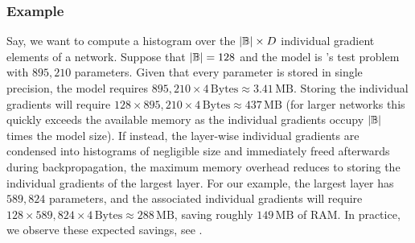 \subsubsection{Example}

Say, we want to compute a histogram over the $|{\mathbb{B}}| \times D$ individual
gradient elements of a network. Suppose that $|{\mathbb{B}}| = 128$ and the model is
\deepobs's \cifarten \threecthreed test problem with $895,210$ parameters. Given
that every parameter is stored in single precision, the model requires $895,210
\times 4\,\text{Bytes} \approx 3.41\,\text{MB}$.
Storing the individual gradients will require $128 \times 895,210 \times
4\,\text{Bytes} \approx 437\,\text{MB}$ (for larger networks this quickly
exceeds the available memory as the individual gradients occupy $|{\mathbb{B}}|$ times
the model size). If instead, the layer-wise individual gradients are condensed
into histograms of negligible size and immediately freed afterwards during
backpropagation, the maximum memory overhead reduces to storing the individual
gradients of the largest layer. For our example, the largest layer has
$589,824$ parameters, and the associated individual gradients will require $128
\times 589,824\times 4\,\text{Bytes} \approx 288\,\text{MB}$, saving roughly
$149\,\text{MB}$ of RAM. In practice, we observe these expected savings, see
.


\captionsetup[subfigure]{justification=justified,singlelinecheck=false}

